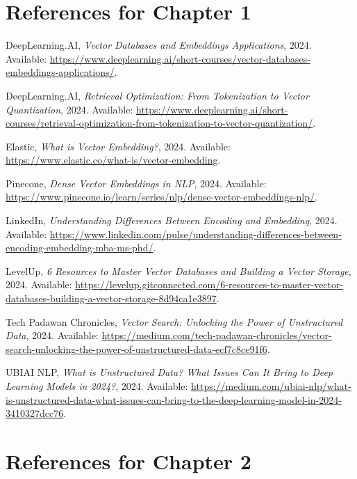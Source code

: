 \documentclass[12pt,a4paper,twoside,openright,justified]{book}
\begin{document}
\begin{thebibliography}{99}
\section*{References for Chapter 1}
 DeepLearning.AI, \textit{Vector Databases and Embeddings Applications}, 2024. Available: \url{https://www.deeplearning.ai/short-courses/vector-databases-embeddings-applications/}.

 DeepLearning.AI, \textit{Retrieval Optimization: From Tokenization to Vector Quantization}, 2024. Available: \url{https://www.deeplearning.ai/short-courses/retrieval-optimization-from-tokenization-to-vector-quantization/}.

 Elastic, \textit{What is Vector Embedding?}, 2024. Available: \url{https://www.elastic.co/what-is/vector-embedding}.

 Pinecone, \textit{Dense Vector Embeddings in NLP}, 2024. Available: \url{https://www.pinecone.io/learn/series/nlp/dense-vector-embeddings-nlp/}.

 LinkedIn, \textit{Understanding Differences Between Encoding and Embedding}, 2024. Available: \url{https://www.linkedin.com/pulse/understanding-differences-between-encoding-embedding-mba-ms-phd/}.

 LevelUp, \textit{6 Resources to Master Vector Databases and Building a Vector Storage}, 2024. Available: \url{https://levelup.gitconnected.com/6-resources-to-master-vector-databases-building-a-vector-storage-8d94ca1e3897}.

 Tech Padawan Chronicles, \textit{Vector Search: Unlocking the Power of Unstructured Data}, 2024. Available: \url{https://medium.com/tech-padawan-chronicles/vector-search-unlocking-the-power-of-unstructured-data-ecf7c8ce91f6}.

 UBIAI NLP, \textit{What is Unstructured Data? What Issues Can It Bring to Deep Learning Models in 2024?}, 2024. Available: \url{https://medium.com/ubiai-nlp/what-is-unstructured-data-what-issues-can-bring-to-the-deep-learning-model-in-2024-3410327dcc76}.


\section*{References for Chapter 2}



\end{thebibliography}
\end{document}
